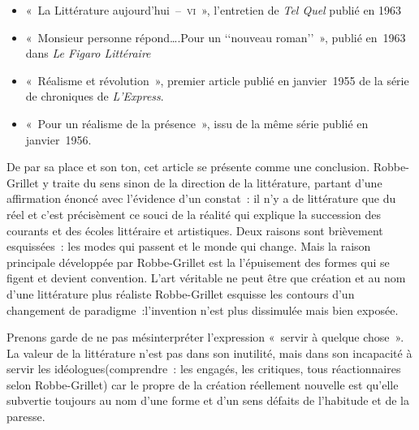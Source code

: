 \documentclass[12pt, a4paper]{article}
\begin{document}
\begin{itemize}

	\item «~La Littérature aujourd'hui~–~\textsc{vi}~», l'entretien de \textit{Tel Quel} publié en 1963

	\item «~Monsieur personne répond….Pour un ‘‘nouveau roman’’~», publié en~1963 dans \textit{Le Figaro Littéraire}

	\item «~Réalisme et révolution~», premier article publié en janvier~1955 de la série de chroniques de \textit{L'Express}.

	\item «~Pour un réalisme de la présence~», issu de la même série publié en janvier~1956.
\end{itemize}
De par sa place et son ton, cet article se présente comme une conclusion. Robbe-Grillet y traite du sens sinon de la direction de la littérature, partant d'une affirmation énoncé avec l'évidence d'un constat~: il n'y a de littérature que du réel et c'est précisèment ce souci de la réalité qui explique la succession des courants et des écoles littéraire et artistiques. Deux raisons sont brièvement esquissées~: les modes qui passent et le monde qui change. Mais la raison principale développée par Robbe-Grillet est la l'épuisement des formes qui se figent et devient convention. L'art véritable ne peut être que création et au nom d'une littérature plus réaliste Robbe-Grillet esquisse les contours d'un changement de paradigme~:l'invention n'est plus dissimulée mais bien exposée.

Prenons garde de ne pas mésinterpréter l'expression «~servir à quelque chose~». La valeur de la littérature n'est pas dans son inutilité, mais dans son incapacité à servir les idéologues(comprendre~: les engagés, les critiques, tous réactionnaires selon Robbe-Grillet) car le propre de la création réellement nouvelle est qu'elle subvertie toujours au nom d'une forme et d'un sens défaits de l'habitude et de la paresse.





 

	
\end{document}
